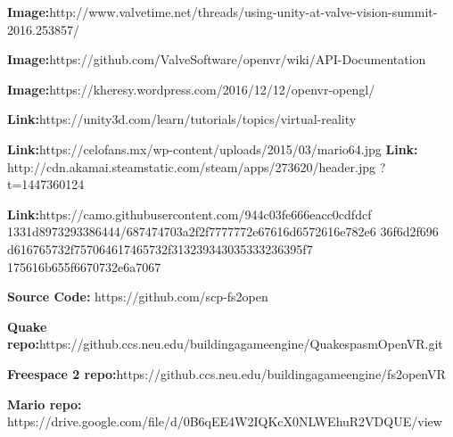 \documentclass[journal]{IEEEtran}
\begin{document}
\begin{thebibliography}{10}
	
				
	\textbf{Image:}http://www.valvetime.net/threads/using-unity-at-valve-vision-summit-2016.253857/
		
			\textbf{Image:}https://github.com/ValveSoftware/openvr/wiki/API-Documentation
			
			\textbf{Image:}https://kheresy.wordpress.com/2016/12/12/openvr-opengl/
			
			\textbf{Link:}https://unity3d.com/learn/tutorials/topics/virtual-reality
			
			\textbf{Link:}https://celofans.mx/wp-content/uploads/2015/03/mario64.jpg 
			\textbf{Link:} http://cdn.akamai.steamstatic.com/steam/apps/273620/header.jpg\hspace{1cm} ?t=1447360124	
			
			\textbf{Link:}https://camo.githubusercontent.com/944c03fe666eacc0cdfdcf\hspace{1cm} 1331d8973293386444/687474703a2f2f7777772e67616d6572616e782e6\hspace{1cm} 36f6d2f696
			d616765732f757064617465732f313239343035333236395f7\hspace{1cm} 175616b655f6670732e6a7067
			
			\textbf{Source Code:} https://github.com/scp-fs2open 
			
			\textbf{Quake repo:}https://github.ccs.neu.edu/buildingagameengine/Quakespas\hspace{1cm}mOpenVR.git
			
			\textbf{Freespace 2 repo:}https://github.ccs.neu.edu/buildingagameengine/fs2op\hspace{1cm}enVR
			
			\textbf{Mario repo:} https://drive.google.com/file/d/0B6qEE4W2IQKcX0NLW\hspace{1cm}EhuR2VDQUE/view

\end{thebibliography}
\end{document}
